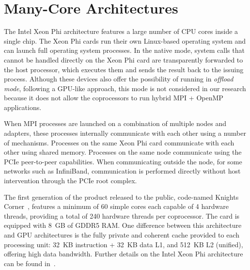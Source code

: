 \section{Many-Core Architectures}\label{sec:back-manycore}

The Intel Xeon Phi architecture features a large number of CPU cores
inside a single chip.  The Xeon Phi cards run their own Linux-based
operating system and can launch full operating system processes.  In
the native mode, system calls that cannot be handled directly on the
Xeon Phi card are transparently forwarded to the host processor, which
executes them and sends the result back to the issuing process.
Although these devices also offer the possibility of running in
\emph{offload mode}, following a GPU-like approach, this mode is not
considered in our research because it does not allow the coprocessors
to run hybrid MPI + OpenMP applications.

When MPI processes are launched on a combination of multiple nodes and
adapters, these processes internally communicate with each other using
a number of mechanisms.  Processes on the same Xeon Phi card
communicate with each other using shared memory.  Processes on the
same node communicate using the PCIe peer-to-peer capabilities.  When
communicating outside the node, for some networks such as InfiniBand,
communication is performed directly without host intervention through
the PCIe root complex.

The first generation of the product released to the public, code-named
Knights Corner~\cite{knc}, features a minimum of 60 simple cores each
capable of 4 hardware threads, providing a total of 240 hardware
threads per coprocessor.  The card is equipped with 8~GB of GDDR5 RAM.
One difference between this architecture and GPU architectures is the
fully private and coherent cache provided to each processing unit:
32~KB instruction + 32~KB data L1, and 512~KB L2 (unified), offering
high data bandwidth.  Further details on the Intel Xeon Phi
architecture can be found in~\cite{mic,knc}.



